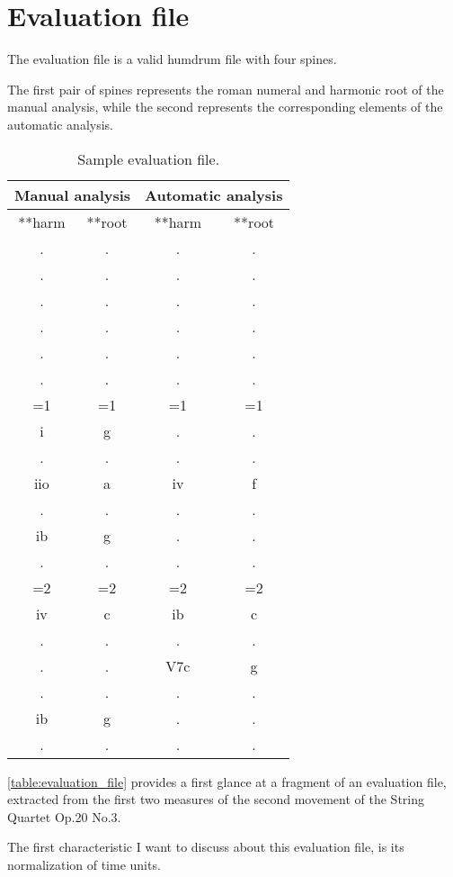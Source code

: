 \section{Evaluation file}
	The evaluation file is a valid humdrum file with four spines.

	The first pair of spines represents the roman numeral and harmonic root of the manual analysis, while the second represents the corresponding elements of the automatic analysis.

	\begin{table}[tbp]
	\centering
	\begin{tabular}{|cc|cc|}
	\hline
	\multicolumn{2}{|c|}{Manual analysis} & \multicolumn{2}{c|}{Automatic analysis} \\ \hline
	**harm & **root & **harm & **root \\
	. & . & . & . \\
	. & . & . & . \\
	. & . & . & . \\
	. & . & . & . \\
	. & . & . & . \\
	. & . & . & . \\
	=1 & =1 & =1 & =1 \\
	i & g & . & . \\
	. & . & . & . \\
	iio & a & iv & f \\
	. & . & . & . \\
	ib & g & . & . \\
	. & . & . & . \\
	=2 & =2 & =2 & =2 \\
	iv & c & ib & c \\
	. & . & . & . \\
	. & . & V7c & g \\
	. & . & . & . \\
	ib & g & . & . \\
	. & . & . & . \\ \hline
	\end{tabular}
	\caption{Sample evaluation file.}
	\label{table:evaluation_file}
	\end{table}

	\autoref{table:evaluation_file} provides a first glance at a fragment of an evaluation file, extracted from the first two measures of the second movement of the String Quartet Op.20 No.3.

	The first characteristic I want to discuss about this evaluation file, is its normalization of time units.


